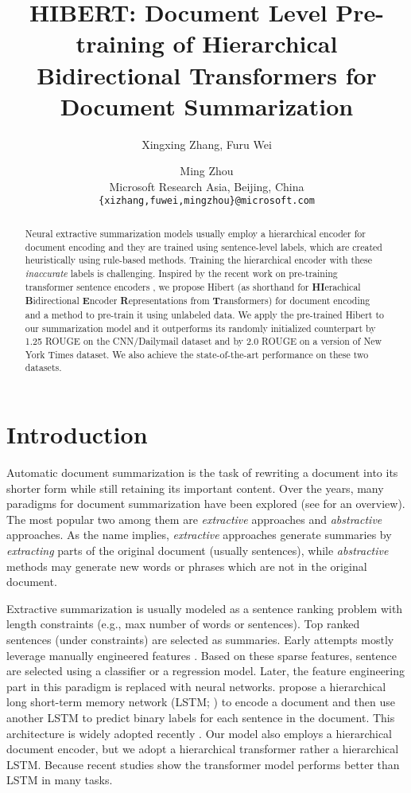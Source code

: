\documentclass[11pt,a4paper]{article}
\title{HIBERT: Document Level Pre-training of Hierarchical Bidirectional Transformers for Document Summarization}
\author{Xingxing Zhang, Furu Wei \and Ming Zhou \\
	Microsoft Research Asia, Beijing, China \\
	\texttt{\{xizhang,fuwei,mingzhou\}@microsoft.com} 
}
\date{}
\begin{document}
\maketitle
\begin{abstract}
Neural extractive summarization models usually employ a hierarchical encoder for document encoding and they are trained using sentence-level labels, which are created heuristically using rule-based methods. Training the hierarchical encoder with these \emph{inaccurate} labels is challenging. Inspired by the recent work on pre-training transformer sentence encoders \cite{devlin:2018:arxiv}, we propose {\sc Hibert} (as shorthand for {\bf HI}erachical {\bf B}idirectional {\bf E}ncoder {\bf R}epresentations from {\bf T}ransformers) for document encoding and a method to pre-train it using unlabeled data. We apply the pre-trained {\sc Hibert} to our summarization model and it outperforms its randomly initialized counterpart by 1.25 ROUGE on the CNN/Dailymail dataset and by 2.0 ROUGE on a version of New York Times dataset. We also achieve the state-of-the-art performance on these two datasets.
\end{abstract}

\section{Introduction}

Automatic document summarization is the task of rewriting a document into its shorter form while still retaining its important content. Over the years, many paradigms for document summarization have been explored (see  for an overview). The most popular two among them are \emph{extractive} approaches and \emph{abstractive} approaches. As the name implies, \emph{extractive} approaches generate summaries by \emph{extracting} parts of the original document (usually sentences), while \emph{abstractive} methods may generate new words or phrases which are not in the original document. 

Extractive summarization is usually modeled as a sentence ranking problem with length constraints (e.g., max number of words or sentences). Top ranked sentences (under constraints) are selected as summaries. Early attempts mostly leverage manually engineered features \cite{filatova:2004:acl:workshop}. Based on these sparse features, sentence are selected using a classifier or a regression model. Later, the feature engineering part in this paradigm is replaced with neural networks.  propose a hierarchical long short-term memory network (LSTM; \citealt{hochreiter:1997:nc}) to encode a document and then use another LSTM to predict binary labels for each sentence in the document. This architecture is widely adopted  recently \cite{nallapati:2017:aaai,Narayan:ea:2018,zhang:2018:emnlp}. Our model also employs a hierarchical document encoder, but we adopt a hierarchical transformer \cite{vaswani:2017:nips} rather a hierarchical LSTM. Because recent studies \cite{vaswani:2017:nips,devlin:2018:arxiv} show the transformer model performs better than LSTM in many tasks.
\end{document}
